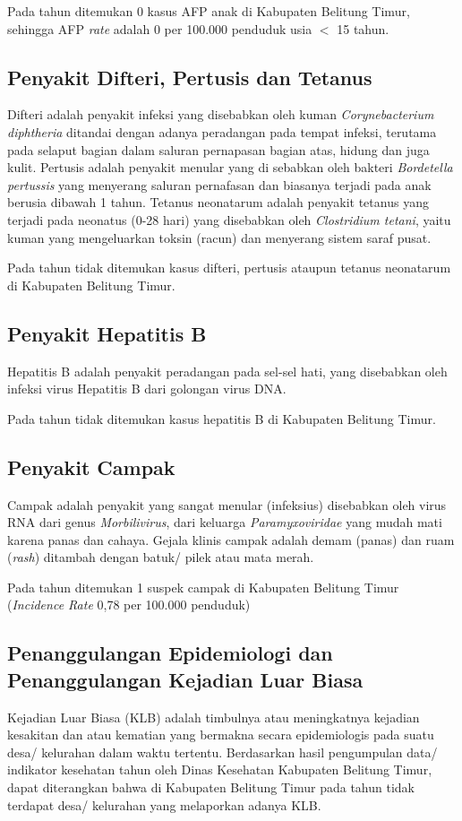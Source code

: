 Pada tahun \tP ditemukan 0 kasus AFP anak di Kabupaten Belitung Timur, sehingga AFP \emph{rate} adalah 0 per 100.000 penduduk usia $<$ 15 tahun.

\subsection{Penyakit Difteri, Pertusis dan Tetanus}
Difteri adalah penyakit infeksi yang disebabkan oleh kuman \emph{Corynebacterium diphtheria} ditandai dengan adanya peradangan pada tempat infeksi, terutama pada selaput bagian dalam saluran pernapasan bagian atas, hidung dan juga kulit.
Pertusis adalah penyakit menular yang di sebabkan oleh bakteri \emph{Bordetella pertussis} yang menyerang saluran pernafasan dan biasanya terjadi pada anak berusia dibawah 1 tahun.
Tetanus neonatarum adalah penyakit tetanus yang terjadi pada neonatus (0-28 hari) yang disebabkan oleh \emph{Clostridium tetani}, yaitu kuman yang mengeluarkan toksin (racun) dan menyerang sistem saraf pusat.

Pada tahun \tP tidak ditemukan kasus difteri, pertusis ataupun tetanus neonatarum di Kabupaten Belitung Timur.

\subsection{Penyakit Hepatitis B}
Hepatitis B adalah penyakit peradangan pada sel-sel hati, yang disebabkan oleh infeksi virus Hepatitis B dari golongan virus DNA.

Pada tahun \tP tidak ditemukan kasus hepatitis B di Kabupaten Belitung Timur.

\subsection{Penyakit Campak}
Campak adalah penyakit yang sangat menular  (infeksius)  disebabkan  oleh  virus RNA dari genus \emph{Morbilivirus}, dari keluarga \emph{Paramyxoviridae} yang mudah mati karena panas dan cahaya.
Gejala klinis campak adalah demam (panas) dan ruam (\emph{rash}) ditambah dengan batuk/ pilek atau mata merah.

Pada tahun \tP ditemukan 1 suspek campak di Kabupaten Belitung Timur (\emph{Incidence Rate} 0,78 per 100.000 penduduk)

\subsection{Penanggulangan Epidemiologi dan Penanggulangan Kejadian Luar Biasa}
Kejadian Luar Biasa (KLB) adalah timbulnya atau meningkatnya kejadian kesakitan dan atau kematian yang bermakna secara epidemiologis pada suatu desa/ kelurahan dalam waktu tertentu.
Berdasarkan hasil pengumpulan data/ indikator kesehatan tahun \tP  oleh Dinas Kesehatan Kabupaten Belitung Timur, dapat diterangkan bahwa di Kabupaten Belitung Timur pada tahun \tP tidak terdapat desa/ kelurahan yang melaporkan adanya KLB.

